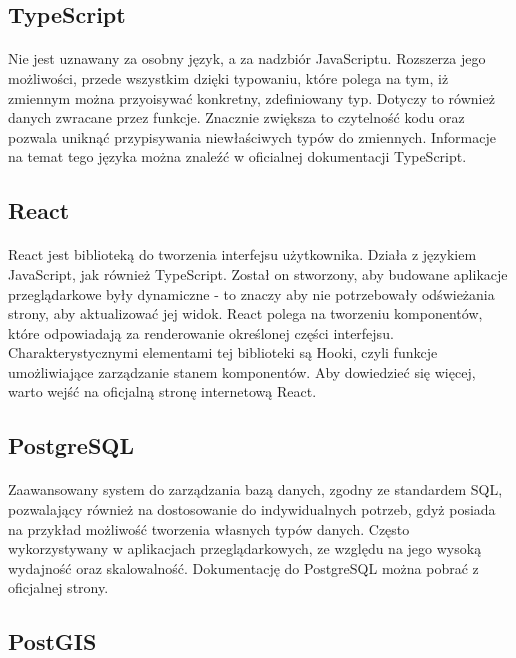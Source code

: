 \subsection{TypeScript}
\paragraph{}
Nie jest uznawany za osobny język, a za nadzbiór JavaScriptu. Rozszerza jego możliwości, przede wszystkim dzięki typowaniu, które polega na tym, iż zmiennym można przyoisywać konkretny, zdefiniowany typ. Dotyczy to również danych zwracane przez funkcje. Znacznie zwiększa to czytelność kodu oraz pozwala uniknąć przypisywania niewłaściwych typów do zmiennych. Informacje na temat tego języka można znaleźć w oficialnej dokumentacji TypeScript.

\subsection{React}
\paragraph{}
React jest biblioteką do tworzenia interfejsu użytkownika. Działa z językiem JavaScript, jak również TypeScript. Został on stworzony, aby budowane aplikacje przeglądarkowe były dynamiczne - to znaczy aby nie potrzebowały odświeżania strony, aby aktualizować jej widok. React polega na tworzeniu komponentów, które odpowiadają za renderowanie określonej części interfejsu. Charakterystycznymi elementami tej biblioteki są Hooki, czyli funkcje umożliwiające zarządzanie stanem komponentów. Aby dowiedzieć się więcej, warto wejść na oficjalną stronę internetową React.

\subsection{PostgreSQL}
\paragraph{}
Zaawansowany system do zarządzania bazą danych, zgodny ze standardem SQL, pozwalający również na dostosowanie do indywidualnych potrzeb, gdyż posiada na przykład możliwość tworzenia własnych typów danych. Często wykorzystywany w aplikacjach przeglądarkowych, ze względu na jego wysoką wydajność oraz skalowalność. Dokumentację do PostgreSQL można pobrać z oficjalnej strony.

\subsection{PostGIS}
